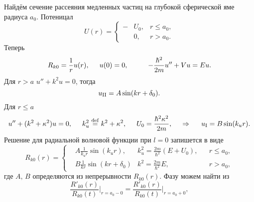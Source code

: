 
Найдём сечение рассеяния медленных частиц на глубокой сферической яме радиуса $a_0$. Потеницал
\begin{equation*}
	U(r) = \left\{\begin{aligned}
	    - &U_0, & r \leq a_0, \\
	    &0, & r > a_0. 
	\end{aligned}\right.
\end{equation*}
Теперь
\begin{equation*}
	R_{k0} = \frac{1}{r} u(r),
	\hspace{5 mm} 
	u(0) = 0,
	\hspace{10 mm} 
	- \frac{\hbar^2}{2m} u'' + V u = E u.
\end{equation*}
Для $r > a$ $u'' + k^2 u = 0$, тогда
\begin{equation*}
	u_{\textnormal{II}} = A \sin(kr + \delta_0).
\end{equation*}
Для $r\leq a$ 
\begin{equation*}
	u'' + (k^2 + \kappa^2) u = 0,
	\hspace{5 mm} 
	k^2_u \overset{\mathrm{def}}{=} k^2 + \kappa^2,
	\hspace{5 mm} 
	U_0 = \frac{\hbar^2 \kappa^2}{2m},
	\hspace{0.5cm} \Rightarrow \hspace{0.5cm}
	u_{\textnormal{I}} = B \sin(k_u r).
\end{equation*}
Решение для радиальной волновой функции при $l=0$ запишется в виде
\begin{equation*}
	R_{k0} (r) = \left\{\begin{aligned}
	    &A \tfrac{1}{k_u r} \sin(k_u r),
	    & k_u^2 = \tfrac{2m}{\hbar^2}(E+U_0),
	    && r \leq a_0,
	    \\
	    & B \tfrac{1}{kr} \sin(k r + \delta_0)
	    & k^2 = \tfrac{2m}{\hbar^2} E,
	    && r > a_0,
	\end{aligned}\right.
\end{equation*}
где $A,\, B$ определяются из непрерывности $R_{k0}(r)$. Фазу можем найти из
\begin{equation*}
	\frac{R'_{k0}(r)}{R_{k0}(t)} \bigg|_{r=a_0 - 0} = 
	\frac{R'_{k0}(r)}{R_{k0}(t)} \bigg|_{r=a_0 + 0},
\end{equation*}
